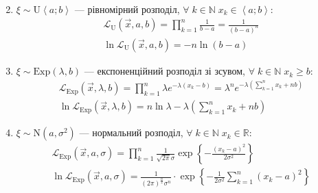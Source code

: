 \begin{enumerate}
\begin{gather*}
    \end{gather*}
    \item $\xi \sim \mathrm{U}\left< a; b\right>$ --- рівномірний розподіл, $\forall \; k \in \mathbb{N} \; x_k \in \left< a; b\right>$:
    \begin{gather*}
        \mathcal{L}_{\mathrm{U}}(\vec{x}, a, b) = \prod\limits_{k=1}^n \frac{1}{b-a} = \frac{1}{(b-a)^n} \\
        \ln\mathcal{L}_{\mathrm{U}}(\vec{x}, a, b) = -n \ln{(b-a)}
    \end{gather*} 
    \item $\xi \sim \mathrm{Exp}(\lambda, b)$ --- експоненційний розподіл зі зсувом, $\forall \; k \in \mathbb{N} \; x_k \geq b$:
    \begin{gather*}
        \mathcal{L}_{\mathrm{Exp}}(\vec{x}, \lambda, b) = \prod\limits_{k=1}^n \lambda e^{-\lambda (x_k-b)} = \lambda^n e^{-\lambda\left(\sum\limits_{k=1}^n x_k + n b\right)} \\
        \ln \mathcal{L}_{\mathrm{Exp}}(\vec{x}, \lambda, b) = n \ln \lambda - \lambda\left(\sum\limits_{k=1}^n x_k + n b\right)
    \end{gather*}
    \item $\xi \sim \mathrm{N}(a, \sigma^2)$ --- нормальний розподіл, $\forall \; k \in \mathbb{N} \; x_k \in \mathbb{R}$:
    \begin{gather*}
        \mathcal{L}_{\mathrm{Exp}}(\vec{x}, a, \sigma) = \prod\limits_{k=1}^n \frac{1}{\sqrt{2\pi}\sigma} \exp\left\{-\frac{(x_k - a)^2}{2\sigma^2}\right\} \\
        \ln \mathcal{L}_{\mathrm{Exp}}(\vec{x}, a, \sigma) = \frac{1}{(2\pi)^{\frac{n}{2}} \sigma^n} \cdot \exp\left\{-\frac{1}{2\sigma^2}\sum\limits_{k=1}^n (x_k - a)^2\right\}
    \end{gather*}
\end{enumerate}